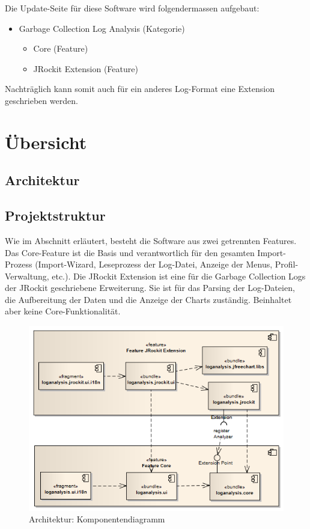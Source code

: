 Die Update-Seite für diese Software wird folgendermassen aufgebaut:
\begin{itemize}
	\item Garbage Collection Log Analysis (Kategorie)
		\begin{itemize}
			\item Core (Feature)
			\item JRockit Extension (Feature)
		\end{itemize}
\end{itemize}
Nachträglich kann somit auch für ein anderes Log-Format eine Extension geschrieben werden.

\section{Übersicht}

\subsection{Architektur}

\subsection{Projektstruktur}
Wie im Abschnitt  erläutert, besteht die Software aus zwei getrennten Features. Das Core-Feature ist die Basis und verantwortlich für den gesamten Import-Prozess (Import-Wizard, Leseprozess der Log-Datei, Anzeige der Menus, Profil-Verwaltung, etc.). Die JRockit Extension ist eine für die Garbage Collection Logs der JRockit geschriebene Erweiterung. Sie ist für das Parsing der Log-Dateien, die Aufbereitung der Daten und die Anzeige der Charts zuständig. Beinhaltet aber keine Core-Funktionalität.
 \begin{figure}[H]
  	\centering
        	\caption{Architektur: Komponentendiagramm}
    	\includegraphics[width=15cm]{images/architektur_komponenten_uebersicht}
\end{figure}

